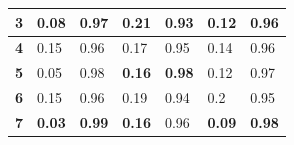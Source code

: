 \begin{table}[h!]
\begin{tabular}{|l|l|l|l|l|l|l|}
\textbf{3}                                                         & 0.08                                                                      & 0.97                                                                       & 0.21                                                                   & 0.93                                                                    & 0.12                                                               & 0.96                                                                \\ \hline
\textbf{4}                                                         & 0.15                                                                      & 0.96                                                                       & 0.17                                                                   & 0.95                                                                    & 0.14                                                               & 0.96                                                                \\ \hline
\textbf{5}                                                         & 0.05                                                                      & 0.98                                                                       & \textbf{0.16}                                                          & \textbf{0.98}                                                           & 0.12                                                               & 0.97                                                                \\ \hline
\textbf{6}                                                         & 0.15                                                                      & 0.96                                                                       & 0.19                                                                   & 0.94                                                                    & 0.2                                                                & 0.95                                                                \\ \hline
\textbf{7}                                                         & \textbf{0.03}                                                             & \textbf{0.99}                                                              & \textbf{0.16}                                                          & 0.96                                                                    & \textbf{0.09}                                                      & \textbf{0.98}                                                       \\ \hline

\end{tabular}
\end{table}
